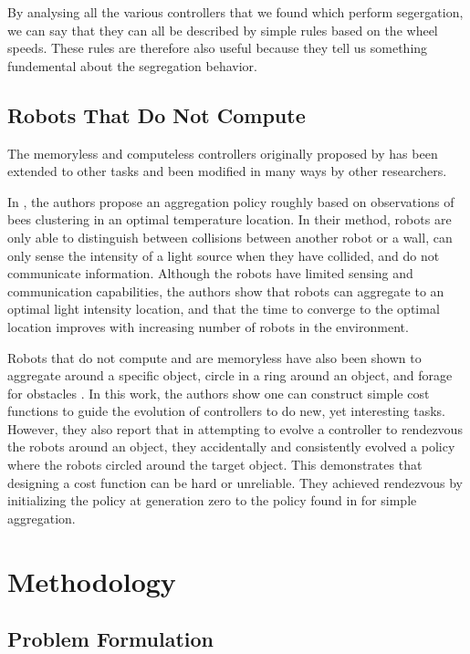 \documentclass[conference]{IEEEtran}
\begin{document}
    By analysing all the various controllers that we found which perform segergation, we can say that they can all be described by simple rules based on the wheel speeds. These rules are therefore also useful because they tell us something fundemental about the segregation behavior.

  \subsection{Robots That Do Not Compute}

    The memoryless and computeless controllers originally proposed by \cite{gauci_self-organized_2014} has been extended to other tasks and been modified in many ways by other researchers.

    In \cite{kernbach_re-embodiment_2009}, the authors propose an aggregation policy roughly based on observations of bees clustering in an optimal temperature location. In their method, robots are only able to distinguish between collisions between another robot or a wall, can only sense the intensity of a light source when they have collided, and do not communicate information. Although the robots have limited sensing and communication capabilities, the authors show that robots can aggregate to an optimal light intensity location, and that the time to converge to the optimal location improves with increasing number of robots in the environment.

    Robots that do not compute and are memoryless have also been shown to aggregate around a specific object, circle in a ring around an object, and forage for obstacles \cite{johnson_evolving_2016}. In this work, the authors show one can construct simple cost functions to guide the evolution of controllers to do new, yet interesting tasks. However, they also report that in attempting to evolve a controller to rendezvous the robots around an object, they accidentally and consistently evolved a policy where the robots circled around the target object. This demonstrates that designing a cost function can be hard or unreliable. They achieved rendezvous by initializing the policy at generation zero to the policy found in \cite{gauci_self-organized_2014} for simple aggregation.

\section{Methodology}

  \subsection{Problem Formulation}
\end{document}
